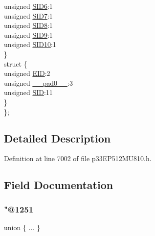 \begin{DoxyCompactItemize}
\begin{tabbing}
\>\>unsigned \hyperlink{structtag_c2_r_x_f14_s_i_d_b_i_t_s_a70d70952133eb2389d5c326f9f0e8035}{SID6}:1\\
\>\>unsigned \hyperlink{structtag_c2_r_x_f14_s_i_d_b_i_t_s_a34097fb76decd431701fa2d86a22328e}{SID7}:1\\
\>\>unsigned \hyperlink{structtag_c2_r_x_f14_s_i_d_b_i_t_s_afe74894633244fdb0b0c01b4e8c522e7}{SID8}:1\\
\>\>unsigned \hyperlink{structtag_c2_r_x_f14_s_i_d_b_i_t_s_a33587704948067005c2a6a3ccc503c99}{SID9}:1\\
\>\>unsigned \hyperlink{structtag_c2_r_x_f14_s_i_d_b_i_t_s_a1a9084031c7f5fb16007feeebf0d8216}{SID10}:1\\
\>\} \\
\>struct \{\\
\>\>unsigned \hyperlink{structtag_c2_r_x_f14_s_i_d_b_i_t_s_ae80b378c9141f7c03e0b4e55b5f4b54d}{EID}:2\\
\>\>unsigned \hyperlink{structtag_c2_r_x_f14_s_i_d_b_i_t_s_adf71f3d8410c1f1dbbc96680a92c49af}{\_\_pad0\_\_}:3\\
\>\>unsigned \hyperlink{structtag_c2_r_x_f14_s_i_d_b_i_t_s_af88edf93b2fee2432665bd84f51287e4}{SID}:11\\
\>\} \\
\}; \\

\end{tabbing}\end{DoxyCompactItemize}


\subsection{Detailed Description}


Definition at line 7002 of file p33\+E\+P512\+M\+U810.\+h.



\subsection{Field Documentation}
\mbox{\label{structtag_c2_r_x_f14_s_i_d_b_i_t_s_a182561f22d8be34740145768b573d989}} 
\subsubsection{\texorpdfstring{"@1251}{@1251}}
{\footnotesize\ttfamily union \{ ... \} }

\mbox{\label{structtag_c2_r_x_f14_s_i_d_b_i_t_s_adf71f3d8410c1f1dbbc96680a92c49af}} 
